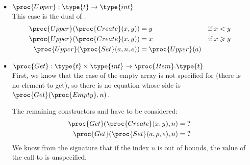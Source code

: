 \begin{itemize}
  \item \(\proc{Upper} : \type{t} \rightarrow \type{int}\)\\
  This case is the dual of :
  \begin{align}
       \proc{Upper} (\proc{Create} (x, y)) 
    &= y
    &  \text{if} \;x < y \label{Upper_1}\\
       \proc{Upper} (\proc{Create} (x, y)) 
    &= x
    &  \text{if} \;x \geqslant y \label{Upper_2}\\
       \proc{Upper} (\proc{Set} (a, n, e)) 
    &= \proc{Upper} (a) \label{Upper_3}
  \end{align}

  \item \(\proc{Get} : \type{t} \times \type{int} \rightarrow
    \proc{Item}.\type{t}\)\\
  First, we know that the case of the empty array is not specified for
   (there is no element to get), so there is no equation
  whose side is \(\proc{Get} (\proc{Empty}, n)\).

  The remaining constructors  and  have to be
  considered:
  \begin{align}
     \proc{Get} (\proc{Create} (x, y), n) 
  &= \textbf{?} \label{Get_1}\\
     \proc{Get} (\proc{Set} (a, p, e), n)
  &= \textbf{?} \label{Get_2}
  \end{align}
  We know from the signature that if the index \(n\) is out of
  bounds, the value of the call to  is unspecified. 


\end{itemize}
